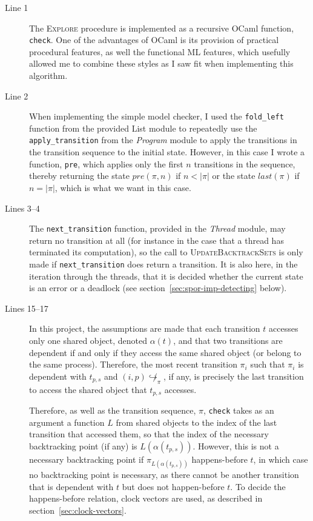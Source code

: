 \documentclass[12pt,a4paper,twoside,openright]{report}
\begin{document}
\begin{description}
	\item[Line 1] The \textsc{Explore} procedure
	is implemented as a recursive OCaml function,
	\texttt{check}.
	One of the advantages of OCaml is its provision
	of practical procedural features, as well the
	functional ML features, which usefully allowed
	me to combine these styles as I saw fit when
	implementing this algorithm.

	\item[Line 2] When implementing the simple
	model checker, I used the \texttt{fold\_left}
	function from the provided List module to
	repeatedly use the \texttt{apply\_transition}
	from the \textit{Program} module to apply
	the transitions in the transition sequence
	to the initial state. However, in this case
	I wrote a function, \texttt{pre},
	which applies only the first
	$n$ transitions in the sequence,
	thereby returning the state
	$\textit{pre}(\pi, n)$ if $n < |\pi|$
	or the state $\textit{last}(\pi)$ if
	$n = |\pi|$, which is what we want in
	this case.

	\item[Lines 3--4] The \texttt{next\_transition}
	function, provided in the \textit{Thread} module,
	may return no transition at all (for instance
	in the case that a thread has terminated its
	computation), so the call to 
	\textsc{UpdateBacktrackSets} is only made if
	\texttt{next\_transition} does return a
	transition. It is also here, in the
	iteration through the threads,
	that it is decided whether the current
	state is an error or a deadlock
	(see section~\ref{sec:spor-imp-detecting}
	below).

	\item[Lines 15--17] In this project,
	the assumptions are made that
	each transition $t$ accesses only one shared
	object, denoted $\alpha(t)$,
	and that two transitions are
	dependent if and only if they access
	the same shared object (or belong to the
	same process). Therefore, the most
	recent transition $\pi_i$ such that
	$\pi_i$ is dependent with $t_{p,s}$
	and $(i,p)\!\not\hookrightarrow_\pi$,
	if any,
	is precisely the last transition
	to access the shared object that
	$t_{p,s}$ accesses.

	Therefore, as well as the transition
	sequence, $\pi$, \texttt{check} takes
	as an argument 
	a function $L$ from shared objects to
	the index of the last transition that
	accessed them, so that the index of the
	necessary backtracking point (if any) is
	$L(\alpha(t_{p,s}))$. However, this
	is not a necessary backtracking point if
	$\pi_{L(\alpha(t_{p,s}))}$ happens-before
	$t$, in which case no backtracking point
	is necessary, as there cannot be another
	transition that is dependent with $t$
	but does not happen-before $t$. To
	decide the happens-before relation,
	clock vectors are used, as described 
	in section~\ref{sec:clock-vectors}.


\end{description}
\end{document}
